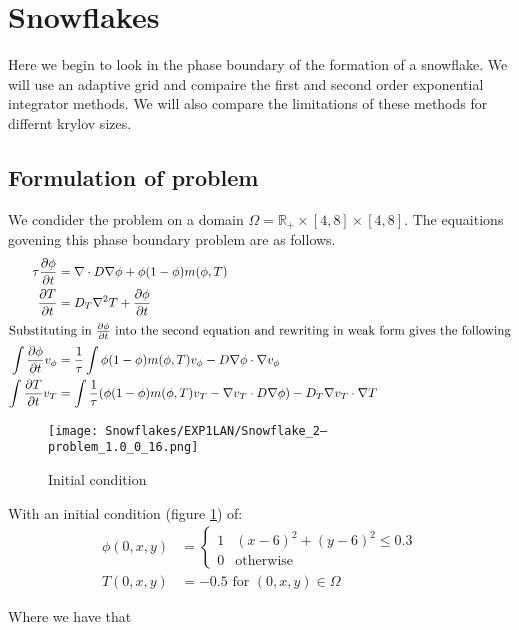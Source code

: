 \section {Snowflakes}
Here we begin to look in the phase boundary of the formation of a snowflake.
We will use an adaptive grid and compaire the first and second order exponential integrator methods.
We will also compare the limitations of these methods for differnt krylov sizes.
\subsection{Formulation of problem}

We condider the problem on a domain $\Omega = \mathbb{R}_+ \times [4, 8] \times [4, 8]$.
The equaitions govening this phase boundary problem are as follows.
\begin{align*}
    \tau \frac{\partial \phi}{\partial t} &= \nabla \cdot D\nabla\phi +  \phi(1-\phi)m(\phi,T)\\
    \frac{\partial T}{\partial t} &= D_T \nabla ^2T + \frac{\partial \phi}{\partial t}\\
    \intertext{Substituting in $\frac{\partial \phi}{\partial t}$ into the second equation and rewriting in weak form gives the following}
    \int \frac{\partial \phi}{\partial t} v_{\phi} &=  \frac 1{\tau}\int \phi(1-\phi)m(\phi,T)v_{\phi} - D \nabla \phi \cdot \nabla v_{\phi}\\
    \int \frac{\partial T}{\partial t} v_T &= \int \frac 1{\tau}(\phi(1-\phi)m(\phi,T)v_T - \nabla v_T \cdot D \nabla \phi) - D_T \nabla v_T \cdot \nabla T
\end{align*}
\begin{figure}[h]
    \centering
    \texttt{[image: Snowflakes/EXP1LAN/Snowflake\_2--problem\_1.0\_0\_16.png]} %
    \caption{Initial condition}
    \label{fig:initial}
\end{figure}
With an initial condition (figure \ref{fig:initial}) of: 
\begin{align*}
    \phi(0,x,y) &= \begin{cases} 
      1 & (x - 6)^2 + (y - 6)^2 \leq 0.3 \\
      0 & \text{otherwise} \end{cases}\\
    T(0,x,y) &= -0.5 \text{  for  } (0,x,y)\in \Omega
\end{align*}

Where we have that

